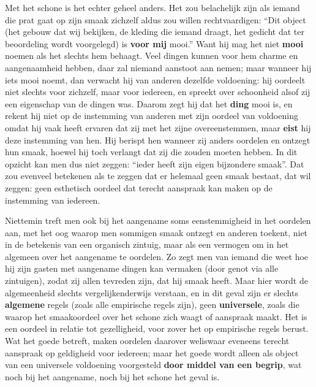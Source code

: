 Met het schone is het echter geheel anders. Het zou belachelijk zijn als iemand die prat gaat op zijn smaak zichzelf aldus zou willen rechtvaardigen: “Dit object (het gebouw dat wij bekijken, de kleding die iemand draagt, het gedicht dat ter beoordeling wordt voorgelegd) is \textbf{voor mij} mooi.” Want hij mag het niet \textbf{mooi} noemen als het slechts hem behaagt. Veel dingen kunnen voor hem charme en aangenaamheid hebben, daar zal niemand aanstoot aan nemen; maar wanneer hij iets mooi noemt, dan verwacht hij van anderen dezelfde voldoening: hij oordeelt niet slechts voor zichzelf, maar voor iedereen, en spreekt over schoonheid alsof zij een eigenschap van de dingen was. Daarom zegt hij dat het \textbf{ding} mooi is, en rekent hij niet op de instemming van anderen met zijn oordeel van voldoening omdat hij vaak heeft ervaren dat zij met het zijne overeenstemmen, maar \textbf{eist} hij deze instemming van hen. Hij berispt hen wanneer zij anders oordelen en ontzegt hun smaak, hoewel hij toch verlangt dat zij die zouden moeten hebben. In dit opzicht kan men dus niet zeggen: “ieder heeft zijn eigen bijzondere smaak”. Dat zou evenveel betekenen als te zeggen dat er helemaal geen smaak bestaat, dat wil zeggen: geen esthetisch oordeel dat terecht aanspraak kan maken op de instemming van iedereen.

Niettemin treft men ook bij het aangename soms eenstemmigheid in het oordelen aan, met het oog waarop men sommigen smaak ontzegt en anderen toekent, niet in de betekenis van een organisch zintuig, maar als een vermogen om in het algemeen over het aangename te oordelen. Zo zegt men van iemand die weet hoe hij zijn gasten met aangename dingen kan vermaken (door genot via alle zintuigen), zodat zij allen tevreden zijn, dat hij smaak heeft. Maar hier wordt de algemeenheid slechts vergelijkenderwijs verstaan, en in dit geval zijn er slechts \textbf{algemene} regels (zoals alle empirische regels zijn), geen \textbf{universele}, zoals die waarop het smaakoordeel over het schone zich waagt of aanspraak maakt. Het is een oordeel in relatie tot gezelligheid, voor zover het op empirische regels berust.
Wat het goede betreft, maken oordelen daarover weliswaar eveneens terecht aanspraak op geldigheid voor iedereen; maar het goede wordt alleen als object van een universele voldoening voorgesteld \textbf{door middel van een begrip}, wat noch bij het aangename, noch bij het schone het geval is.

